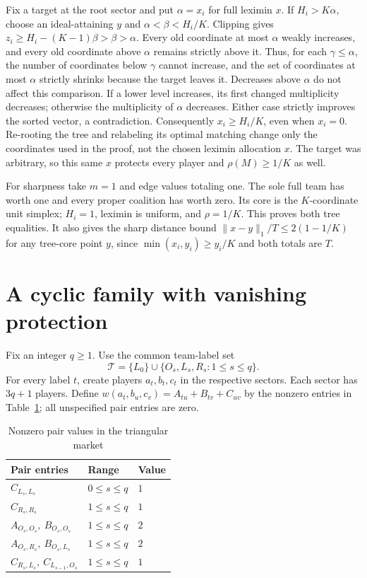 \documentclass[11pt]{article}
\theoremstyle{remark}\newtheorem{remark}[theorem]{Remark}
\begin{document}
Fix a target at the root sector and put $\alpha=x_i$ for full leximin $x$.
If $H_i>K\alpha$, choose an ideal-attaining $y$ and
$\alpha<\beta<H_i/K$. Clipping gives
$z_i\ge H_i-(K-1)\beta>\beta>\alpha$.
Every old coordinate at most $\alpha$ weakly increases, and every old
coordinate above $\alpha$ remains strictly above it. Thus, for each
$\gamma\le\alpha$, the number of coordinates below $\gamma$ cannot
increase, and the set of coordinates at most $\alpha$ strictly shrinks
because the target leaves it. Decreases above $\alpha$ do not affect this
comparison. If a lower level
increases, its first changed multiplicity decreases; otherwise the
multiplicity of $\alpha$ decreases. Either case strictly improves the sorted
vector, a contradiction. Consequently $x_i\ge H_i/K$, even when $x_i=0$.
Re-rooting the tree and relabeling its optimal matching change only the
coordinates used in the proof, not the chosen leximin allocation $x$.
The target was arbitrary, so this same $x$ protects every player and
$\rho(M)\ge1/K$ as well.

For sharpness take $m=1$ and edge values totaling one. The sole full team
has worth one and every proper coalition has worth zero. Its core is the
$K$-coordinate unit simplex; $H_i=1$, leximin is uniform, and
$\rho=1/K$. This proves both tree equalities. It also gives the sharp distance
bound $\|x-y\|_1/T\le2(1-1/K)$ for any tree-core point $y$, since
$\min(x_i,y_i)\ge y_i/K$ and both totals are $T$.
\section{A cyclic family with vanishing protection}
Fix an integer $q\geq1$. Use the common team-label set
\[
           \mathcal T=\{L_0\}\cup\{O_s,L_s,R_s:1\leq s\leq q\}.
\]
For every label $t$, create players $a_t,b_t,c_t$ in the respective
sectors. Each sector has $3q+1$ players. Define
$w(a_t,b_u,c_v)=A_{tu}+B_{tv}+C_{uv}$ by the nonzero entries in Table~\ref{tab:entries};
all unspecified pair entries are zero.

\begin{table}[htbp]
\centering
\caption{Nonzero pair values in the triangular market}\label{tab:entries}
\begin{tabular}{lll}\toprule
Pair entries & Range & Value\\\midrule
$C_{L_s,L_s}$ & $0\leq s\leq q$ & $1$\\
$C_{R_s,R_s}$ & $1\leq s\leq q$ & $1$\\
$A_{O_s,O_s},\ B_{O_s,O_s}$ & $1\leq s\leq q$ & $2$\\
$A_{O_s,R_s},\ B_{O_s,L_s}$ & $1\leq s\leq q$ & $2$\\
$C_{R_s,L_s},\ C_{L_{s-1},O_s}$ & $1\leq s\leq q$ & $1$\\\bottomrule
\end{tabular}
\end{table}
\end{document}
